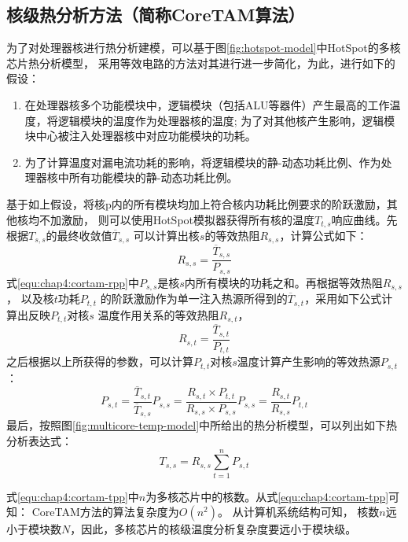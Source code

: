 \subsection{核级热分析方法（简称CoreTAM算法）}
为了对处理器核进行热分析建模，可以基于图\ref{fig:hotspot-model}中HotSpot的多核芯片热分析模型， 采用等效电路的方法对其进行进一步简化，为此，进行如下的假设：
\begin{enumerate}[1)]
\item 在处理器核多个功能模块中，逻辑模块（包括ALU等器件）产生最高的工作温度，将逻辑模块的温度作为处理器核的温度; 为了对其他核产生影响，逻辑模块中心被注入处理器核中对应功能模块的功耗。
\item 为了计算温度对漏电流功耗的影响，将逻辑模块的静-动态功耗比例、作为处理器核中所有功能模块的静-动态功耗比例。
\end{enumerate}

基于如上假设，将核p内的所有模块均加上符合核内功耗比例要求的阶跃激励，其他核均不加激励， 则可以使用HotSpot模拟器获得所有核的温度$T_{t,s}$响应曲线。先根据$T_{s,s}$的最终收敛值$\overline{T}_{s,s}$ 可以计算出核$s$的等效热阻$R_{s,s}$，计算公式如下：
\begin{equation}
\label{equ:chap4:cortam-rpp}
R_{s,s} = \frac{\overline{T}_{s,s}}{P_{s,s}}
\end{equation}
式\ref{equ:chap4:cortam-rpp}中$P_{s,s}$是核$s$内所有模块的功耗之和。再根据等效热阻$R_{s,s}$， 以及核$t$功耗$P_{t,t}$ 的阶跃激励作为单一注入热源所得到的$\overline{T}_{s,t}$，采用如下公式计算出反映$P_{t,t}$对核$s$ 温度作用关系的等效热阻$R_{s,t}$，
\begin{equation}
\label{equ:chap4:cortam-rpq}
R_{s,t} = \frac{\overline{T}_{s,t}}{P_{t,t}}
\end{equation}
之后根据以上所获得的参数，可以计算$P_{t,t}$对核$s$温度计算产生影响的等效热源$P_{s,t}$：
\begin{equation}
\label{equ:chap4:cortam-ppq}
P_{s,t} = \frac{\overline{T}_{s,t}}{\overline{T}_{s,s}}P_{s,s} = \frac{R_{s,t}\times P_{t,t}}{R_{s,s}\times P_{s,s}}P_{s,s} = \frac{R_{s,t}}{R_{s,s}}P_{t,t}
\end{equation}
最后，按照图\ref{fig:multicore-temp-model}中所给出的热分析模型，可以列出如下热分析表达式：
\begin{equation}
\label{equ:chap4:cortam-tpp}
T_{s,s} = R_{s,s}\sum\limits_{t=1}^n P_{s,t}
\end{equation}

式\ref{equ:chap4:cortam-tpp}中$n$为多核芯片中的核数。从式\ref{equ:chap4:cortam-tpp}可知： CoreTAM方法的算法复杂度为$O(n^2)$。 从计算机系统结构可知， 核数$n$远小于模块数$N$，因此，多核芯片的核级温度分析复杂度要远小于模块级。

